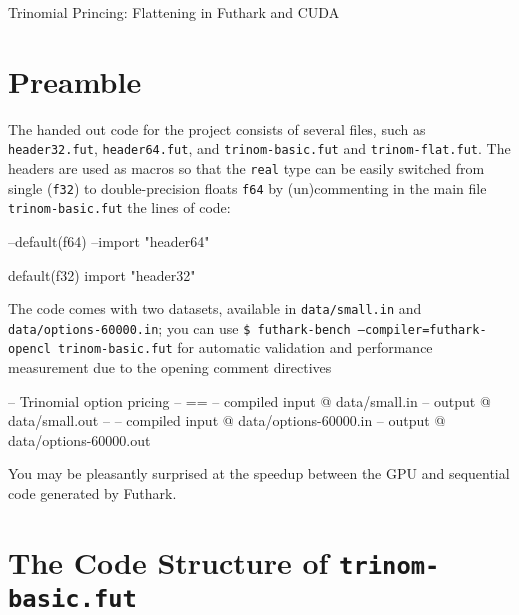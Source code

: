 \documentclass[a4paper,11pt]{article}
\begin{document}

\begin{center}

{\LARGE Trinomial Princing: Flattening in Futhark and CUDA}


\end{center}

\section*{Preamble}

The handed out code for the project consists of several files,
such as {\tt header32.fut}, {\tt header64.fut}, and 
{\tt trinom-basic.fut} and {\tt trinom-flat.fut}.
%
The headers are used as macros so that the {\tt real} type can be 
easily switched from single ({\tt f32}) to double-precision floats 
{\tt f64} by (un)commenting in the main file {\tt trinom-basic.fut} 
the lines of code: 

\begin{fancycode}
--default(f64)
--import "header64"

default(f32)
import "header32"
\end{fancycode}

The code comes with two datasets, available in {\tt data/small.in}
and {\tt data/options-60000.in}; you can use 
{\tt \$ futhark-bench --compiler=futhark-opencl trinom-basic.fut}
for automatic validation and performance measurement due to the 
opening comment directives

\begin{fancycode}
-- Trinomial option pricing
-- ==
-- compiled input @ data/small.in
-- output @ data/small.out
--
-- compiled input @ data/options-60000.in
-- output @ data/options-60000.out
\end{fancycode}

You may be pleasantly surprised at the speedup between the GPU and sequential 
code generated by Futhark.

\section{The Code Structure of {\tt trinom-basic.fut}}
\end{document}
